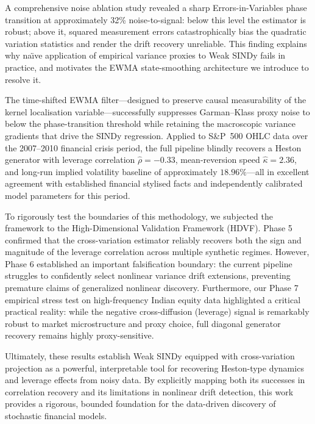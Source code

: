 \documentclass[reprint, amsmath, amssymb, aps, prl, superscriptaddress, nofootinbib]{revtex4-2}
\begin{document}
A comprehensive noise ablation study revealed a sharp Errors-in-Variables
phase transition at approximately 32\% noise-to-signal: below this level the
estimator is robust; above it, squared measurement errors catastrophically bias
the quadratic variation statistics and render the drift recovery unreliable. This
finding explains why na\"{\i}ve application of empirical variance proxies to
Weak SINDy fails in practice, and motivates the EWMA state-smoothing architecture
we introduce to resolve it.

The time-shifted EWMA filter---designed to preserve causal measurability of the
kernel localisation variable---successfully suppresses Garman--Klass proxy noise
to below the phase-transition threshold while retaining the macroscopic variance
gradients that drive the SINDy regression. Applied to S\&P~500 OHLC data over
the 2007--2010 financial crisis period, the full pipeline blindly recovers a
Heston generator with leverage correlation $\hat\rho = -0.33$, mean-reversion
speed $\hat\kappa = 2.36$, and long-run implied volatility baseline of
approximately $18.96\%$---all in excellent agreement with established financial
stylised facts and independently calibrated model parameters for this period.

To rigorously test the boundaries of this methodology, we subjected the framework to the High-Dimensional Validation Framework (HDVF). Phase 5 confirmed that the cross-variation estimator reliably recovers both the sign and magnitude of the leverage correlation across multiple synthetic regimes. However, Phase 6 established an important falsification boundary: the current pipeline struggles to confidently select nonlinear variance drift extensions, preventing premature claims of generalized nonlinear discovery. Furthermore, our Phase 7 empirical stress test on high-frequency Indian equity data highlighted a critical practical reality: while the negative cross-diffusion (leverage) signal is remarkably robust to market microstructure and proxy choice, full diagonal generator recovery remains highly proxy-sensitive.

Ultimately, these results establish Weak SINDy equipped with cross-variation projection as a powerful, interpretable tool for recovering Heston-type dynamics and leverage effects from noisy data. By explicitly mapping both its successes in correlation recovery and its limitations in nonlinear drift detection, this work provides a rigorous, bounded foundation for the data-driven discovery of stochastic financial models.
\end{document}
